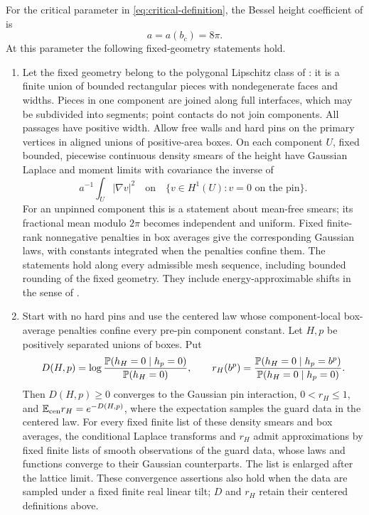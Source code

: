 \begin{proposition}\label{prop:height-inputs}
For the critical parameter in \eqref{eq:critical-definition}, the
Bessel height coefficient of \cite{C} is
\begin{equation}\label{eq:critical-coefficient}
                         a=a(b_c)=8\pi.
\end{equation}
At this parameter the following fixed-geometry statements hold.
\begin{enumerate}
\item Let the fixed geometry belong to the polygonal Lipschitz class
of \cite[Theorem~3.1]{C}: it is a finite union of bounded rectangular
pieces with nondegenerate faces and widths.  Pieces in one component
are joined along full interfaces, which may be subdivided into segments;
point contacts do not join components.  All passages have positive width.
Allow free walls and
hard pins on the primary vertices in aligned unions of positive-area
boxes.  On each component
\(U\), fixed bounded, piecewise continuous density smears of the height
have Gaussian Laplace and moment limits
with covariance the inverse of
\[
 a^{-1}\int_U|\nabla v|^2
 \quad\text{on}\quad
 \{v\in H^1(U):v=0\text{ on the pin}\}.
\]
For an unpinned component this is a statement about mean-free smears;
its fractional mean modulo \(2\pi\) becomes independent and uniform.
Fixed finite-rank nonnegative penalties in box averages give the
corresponding Gaussian laws, with constants integrated when the
penalties confine them.  The statements hold along every admissible
mesh sequence, including bounded rounding of the fixed geometry.
They include energy-approximable shifts in the sense of
\cite[Theorem~3.1]{C}.
\item Start with no hard pins and use the centered law whose
component-local box-average penalties confine every pre-pin component
constant.  Let \(H,p\) be positively separated unions of boxes.  Put
\[
 D(H,p)=\log\frac{\mathbb P(h_H=0\mid h_p=0)}{\mathbb P(h_H=0)},\qquad
 r_H(b^p)=\frac{\mathbb P(h_H=0\mid h_p=b^p)}
                 {\mathbb P(h_H=0\mid h_p=0)}.
\]
Then \(D(H,p)\ge0\) converges to the Gaussian pin interaction,
\(0<r_H\le1\), and
\(\mathbb E_{\mathrm{cen}} r_H=e^{-D(H,p)}\), where the expectation samples
the guard data in the centered law.
For every fixed finite list of these density smears and box averages,
the conditional Laplace transforms and \(r_H\) admit approximations
by fixed finite lists of smooth observations of the guard data, whose
laws and functions converge to their Gaussian counterparts.  The
list is enlarged after the lattice limit.  These convergence assertions
also hold when the data are sampled under a fixed finite real linear
tilt; \(D\) and \(r_H\) retain their centered definitions above.
\end{enumerate}
\end{proposition}

